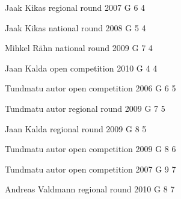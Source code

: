\documentclass[11pt]{article}
\begin{document}
\ylDisplay{} %
{Jaak Kikas} %
{regional round} %
{2007} %
{G 6} %
{4} %
{

\ifEngSolution
\fi
}

\ylDisplay{} %
{Jaak Kikas} %
{national round} %
{2008} %
{G 5} %
{4} %
{

\ifEngSolution
\fi
}

\ylDisplay{} %
{Mihkel Rähn} %
{national round} %
{2009} %
{G 7} %
{4} %
{

\ifEngSolution
\fi
}

\ylDisplay{} %
{Jaan Kalda} %
{open competition} %
{2010} %
{G 4} %
{4} %
{

\ifEngSolution
\fi
}

\ylDisplay{} %
{Tundmatu autor} %
{open competition} %
{2006} %
{G 6} %
{5} %
{

\ifEngSolution
\fi
}

\ylDisplay{} %
{Tundmatu autor} %
{regional round} %
{2009} %
{G 7} %
{5} %
{

\ifEngSolution
\fi
}

\ylDisplay{} %
{Jaan Kalda} %
{regional round} %
{2009} %
{G 8} %
{5} %
{

\ifEngSolution
\fi
}

\ylDisplay{} %
{Tundmatu autor} %
{open competition} %
{2009} %
{G 8} %
{6} %
{

\ifEngSolution
\fi
}

\ylDisplay{} %
{Tundmatu autor} %
{open competition} %
{2007} %
{G 9} %
{7} %
{

\ifEngSolution
\fi
}

\ylDisplay{} %
{Andreas Valdmann} %
{regional round} %
{2010} %
{G 8} %
{7} %
{

\ifEngSolution
\fi
}
\end{document}

